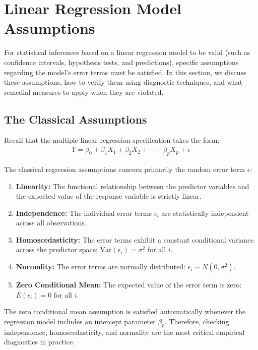 \section{Linear Regression Model Assumptions}

For statistical inferences based on a linear regression model to be valid (such as confidence intervals, hypothesis tests, and predictions), specific assumptions regarding the model's error terms must be satisfied. In this section, we discuss these assumptions, how to verify them using diagnostic techniques, and what remedial measures to apply when they are violated.

\subsection{The Classical Assumptions}

Recall that the multiple linear regression specification takes the form:
\begin{align}
	Y = \beta_0 + \beta_1 X_1 + \beta_2 X_2 + \cdots + \beta_p X_p + \epsilon
\end{align}

The classical regression assumptions concern primarily the random error term $\epsilon$:

\begin{enumerate}
	\item \textbf{Linearity:} The functional relationship between the predictor variables and the expected value of the response variable is strictly linear.
	\item \textbf{Independence:} The individual error terms $\epsilon_i$ are statistically independent across all observations.
	\item \textbf{Homoscedasticity:} The error terms exhibit a constant conditional variance across the predictor space: $\text{Var}(\epsilon_i) = \sigma^2$ for all $i$.
	\item \textbf{Normality:} The error terms are normally distributed: $\epsilon_i \sim N(0, \sigma^2)$.
	\item \textbf{Zero Conditional Mean:} The expected value of the error term is zero: $E(\epsilon_i) = 0$ for all $i$.
\end{enumerate}

\begin{observacion}
	The zero conditional mean assumption is satisfied automatically whenever the regression model includes an intercept parameter $\beta_0$. Therefore, checking independence, homoscedasticity, and normality are the most critical empirical diagnostics in practice.
\end{observacion}

